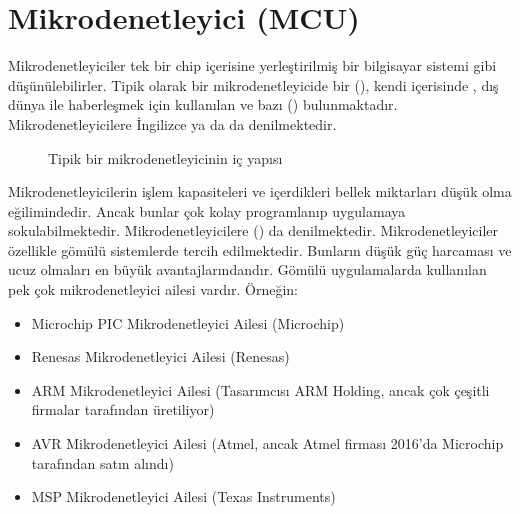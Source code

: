 \documentclass[letterpaper,10pt,turkish]{sphinxmanual}
\begin{document}
\section{Mikrodenetleyici (MCU)}
\label{\detokenize{introduction:mikrodenetleyici-mcu}}
\sphinxAtStartPar
Mikrodenetleyiciler tek bir chip içerisine yerleştirilmiş bir bilgisayar sistemi gibi düşünülebilirler.
Tipik olarak bir mikrodenetleyicide bir  (), kendi içerisinde ,
dış dünya ile haberleşmek için kullanılan  ve bazı 
() bulunmaktadır. Mikrodenetleyicilere İngilizce  ya da
 da denilmektedir.

\begin{figure}[htbp]
\centering
\capstart

\noindent{}
\caption{Tipik bir mikrodenetleyicinin iç yapısı}\label{\detokenize{introduction:id2}}\end{figure}

\sphinxAtStartPar
Mikrodenetleyicilerin işlem kapasiteleri ve içerdikleri bellek miktarları düşük olma eğilimindedir.
Ancak bunlar çok kolay programlanıp uygulamaya sokulabilmektedir. Mikrodenetleyicilere
 () da denilmektedir. Mikrodenetleyiciler özellikle
gömülü sistemlerde tercih edilmektedir. Bunların düşük güç harcaması ve ucuz olmaları en büyük
avantajlarındandır. Gömülü uygulamalarda kullanılan pek çok mikrodenetleyici ailesi vardır.
Örneğin:
\begin{itemize}
\item {} 
\sphinxAtStartPar
Microchip PIC Mikrodenetleyici Ailesi (Microchip)

\item {} 
\sphinxAtStartPar
Renesas Mikrodenetleyici Ailesi (Renesas)

\item {} 
\sphinxAtStartPar
ARM Mikrodenetleyici Ailesi (Tasarımcısı ARM Holding, ancak çok çeşitli firmalar tarafından
üretiliyor)

\item {} 
\sphinxAtStartPar
AVR Mikrodenetleyici Ailesi (Atmel, ancak Atmel firması 2016’da Microchip tarafından satın alındı)

\item {} 
\sphinxAtStartPar
MSP Mikrodenetleyici Ailesi (Texas Instruments)

\end{itemize}
\end{document}
